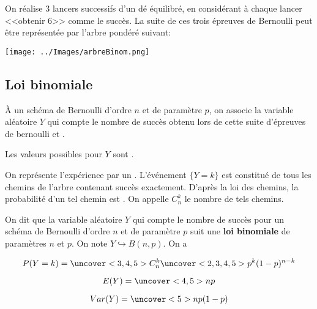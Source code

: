\documentclass{beamer}
\begin{document}
 \begin{frame}
   \begin{example}
 On réalise $3$ lancers successifs d'un dé équilibré, en considérant à chaque lancer <<obtenir 6>>
 comme le succès. La suite de ces trois épreuves de Bernoulli peut être représentée par l'arbre pondéré
 suivant:
 
  \texttt{[image: ../Images/arbreBinom.png]}
 
  
 \end{example}
 \end{frame}

 \subsection{Loi binomiale}

 \begin{frame}
  
  \begin{definition}
  \`A un schéma de Bernoulli d'ordre $n$ et de paramètre $p$, on associe la variable aléatoire $Y$
  qui compte le nombre de succès obtenu lors de cette suite d'épreuves de bernoulli 
   et . 
  
  Les valeurs possibles pour $Y$ sont .
 \end{definition}
  On représente l'expérience par un . L'événement $\lbrace Y=k \rbrace$ est constitué 
  de tous les chemins de l'arbre contenant  succès exactement. D'après la loi des chemins, la probabilité
  d'un tel chemin est . On appelle $C_n^k$ le nombre de tels chemins.

 \end{frame}

 \begin{frame}
  \begin{theorem}
   On dit que la variable aléatoire $Y$ qui compte le nombre de succès pour un schéma de Bernoulli d'ordre $n$ et de paramètre $p$
   suit une \textbf{loi binomiale} de paramètres $n$ et $p$. On note $Y \hookrightarrow B(n,p)$. On a 
   
   $$P(Y=k)=\uncover<3,4,5>{C_n^k} \uncover<2,3,4,5>{p^k (1-p)^{n-k}}$$
   
   $$E(Y)=\uncover<4,5>{np}$$
   
   $$Var(Y)=\uncover<5>{np(1-p)}$$
   
  \end{theorem}
\end{frame}
\end{document}
